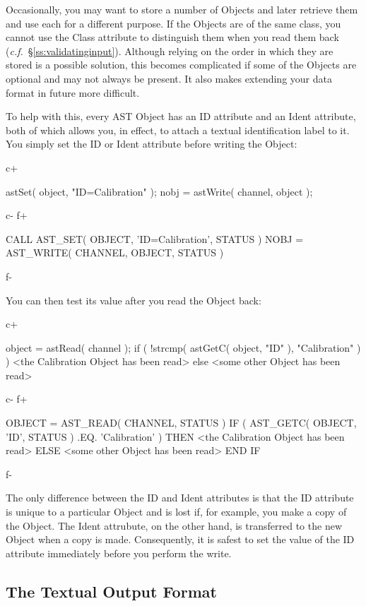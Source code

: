 \documentclass[twoside,11pt]{starlink}
\providecommand{\secref}[1]{\S\ref{#1}}
\begin{document}
{Occasionally, you may want to store a number of Objects and later
retrieve them and use each for a different purpose. If the Objects are
of the same class, you cannot use the Class attribute to distinguish
them when you read them back
(\emph{c.f.}~\secref{ss:validatinginput}). Although relying on the
order in which they are stored is a possible solution, this becomes
complicated if some of the Objects are optional and may not always be
present. It also makes extending your data format in future more
difficult.

To help with this, every AST Object has an ID attribute and an Ident
attribute, both of which allows you, in effect, to attach a textual
identification label to it. You simply set the ID or Ident attribute before
writing the Object:

c+
\small
\begin{terminalv}
astSet( object, "ID=Calibration" );
nobj = astWrite( channel, object );
\end{terminalv}
\normalsize
c-
f+
\small
\begin{terminalv}
      CALL AST_SET( OBJECT, 'ID=Calibration', STATUS )
      NOBJ = AST_WRITE( CHANNEL, OBJECT, STATUS )
\end{terminalv}
\normalsize
f-

You can then test its value after you read the Object back:

c+
\small
\begin{terminalv}
object = astRead( channel );
if ( !strcmp( astGetC( object, "ID" ), "Calibration" ) ) {
   <the Calibration Object has been read>
} else {
   <some other Object has been read>
}
\end{terminalv}
\normalsize
c-
f+
\small
\begin{terminalv}
      OBJECT = AST_READ( CHANNEL, STATUS )
      IF ( AST_GETC( OBJECT, 'ID', STATUS ) .EQ. 'Calibration' ) THEN
         <the Calibration Object has been read>
      ELSE
         <some other Object has been read>
      END IF
\end{terminalv}
\normalsize
f-

The only difference between the ID and Ident attributes is that the ID
attribute is unique to a particular Object and is lost if, for example,
you make a copy of the Object. The Ident attrubute, on the other hand, is
transferred to the new Object when a copy is made. Consequently, it is
safest to set the value of the ID attribute immediately before you
perform the write.

\subsection{\label{ss:textualoutputformat}The Textual Output Format}

}
\end{document}

